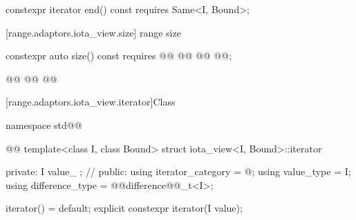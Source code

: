 {\begin{itemdescr}
\pnum
\oldtxt{\returns} 
\end{itemdescr}

%
\begin{itemdecl}
constexpr iterator end() const requires Same<I, Bound>;
\end{itemdecl}

\begin{itemdescr}
\pnum
\oldtxt{\returns} 
\end{itemdescr}

[range.adaptors.iota_view.size]{ range size}

%
\begin{itemdecl}
constexpr auto size() const requires @\oldtxt{\seebelow}@
  @@
  @@
  @@;
\end{itemdecl}

\begin{itemdescr}
\pnum
\oldtxt{\returns}  

\pnum
{}
\begin{codeblock}
@@
@@
@@
\end{codeblock}
\end{itemdescr}

[range.adaptors.iota_view.iterator]{Class }

\begin{codeblock}
namespace std@@ { @@
  template<class I, class Bound>
  struct iota_view<I, Bound>::iterator {
  private:
    I value_ {}; // \expos
  public:
    using iterator_category = @\seebelownc@;
    using value_type = I;
    using difference_type = @@difference@@_t<I>;

    iterator() = default;
    explicit constexpr iterator(I value);

}}
\end{codeblock}}
